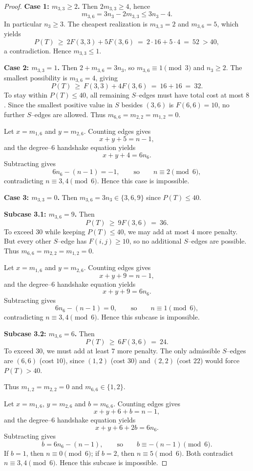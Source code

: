 \documentclass[preprint,12pt]{elsarticle}
\begin{document}
\begin{proof}
\smallskip
\noindent
\textbf{Case 1: $m_{3,3}\ge 2$.}
Then $2m_{3,3}\ge 4$, hence
\[
m_{3,6}=3n_3-2m_{3,3}\le 3n_3-4.
\]
In particular $n_3\ge 3$.
The cheapest realization is $m_{3,3}=2$ and $m_{3,6}=5$, which yields
\[
P(T)\ \ge\ 2F(3,3)+5F(3,6)\ =\ 2\cdot 16 + 5\cdot 4\ =\ 52\ >40,
\]
a contradiction. Hence $m_{3,3}\le 1$.

\smallskip
\noindent
\textbf{Case 2: $m_{3,3}=1$.}
Then $2+m_{3,6}=3n_3$, so $m_{3,6}\equiv 1\pmod 3$ and $n_3\ge 2$.
The smallest possibility is $m_{3,6}=4$, giving
\[
P(T)\ \ge\ F(3,3)+4F(3,6)\ =\ 16+16\ =\ 32.
\]
To stay within $P(T)\le 40$, all remaining $S$–edges must have total cost at most $8$.
Since the smallest positive value in $S$ besides $(3,6)$ is $F(6,6)=10$,
no further $S$–edges are allowed.
Thus $m_{6,6}=m_{2,2}=m_{1,2}=0$.

Let $x=m_{1,6}$ and $y=m_{2,6}$.
Counting edges gives
\[
x+y+5=n-1,
\]
and the degree–$6$ handshake equation yields
\[
x+y+4=6n_6.
\]
Subtracting gives
\[
6n_6-(n-1)=-1,
\qquad\text{so}\qquad
n\equiv 2\pmod 6,
\]
contradicting $n\equiv 3,4\pmod 6$.
Hence this case is impossible.

\smallskip
\noindent
\textbf{Case 3: $m_{3,3}=0$.}
Then $m_{3,6}=3n_3\in\{3,6,9\}$ since $P(T)\le 40$.

\smallskip
\noindent
\textbf{Subcase 3.1: $m_{3,6}=9$.}
Then
\[
P(T)\ \ge\ 9F(3,6)\ =\ 36.
\]
To exceed $30$ while keeping $P(T)\le 40$, we may add at most $4$ more penalty.
But every other $S$–edge has $F(i,j)\ge 10$, so no additional $S$–edges are possible.
Thus $m_{6,6}=m_{2,2}=m_{1,2}=0$.

Let $x=m_{1,6}$ and $y=m_{2,6}$.
Counting edges gives
\[
x+y+9=n-1,
\]
and the degree–$6$ handshake equation yields
\[
x+y+9=6n_6.
\]
Subtracting gives
\[
6n_6-(n-1)=0,
\qquad\text{so}\qquad
n\equiv 1\pmod 6,
\]
contradicting $n\equiv 3,4\pmod 6$.
Hence this subcase is impossible.

\smallskip
\noindent
\textbf{Subcase 3.2: $m_{3,6}=6$.}
Then
\[
P(T)\ \ge\ 6F(3,6)\ =\ 24.
\]
To exceed $30$, we must add at least $7$ more penalty.
The only admissible $S$–edges are $(6,6)$ (cost $10$),
since $(1,2)$ (cost $30$) and  $(2,2)$ (cost $22$) would force $P(T)>40$.

Thus $m_{1,2}=m_{2,2}=0$ and $m_{6,6}\in\{1,2\}$.

Let $x=m_{1,6}$, $y=m_{2,6}$ and $b=m_{6,6}$.
Counting edges gives
\[
x+y+6+b=n-1,
\]
and the degree–$6$ handshake equation yields
\[
x+y+6+2b=6n_6.
\]
Subtracting gives
\[
b=6n_6-(n-1),
\qquad\text{so}\qquad
b\equiv -(n-1)\pmod 6.
\]
If $b=1$, then $n\equiv 0\pmod 6$;  
if $b=2$, then $n\equiv 5\pmod 6$.
Both contradict $n\equiv 3,4\pmod 6$.
Hence this subcase is impossible.


\end{proof}
\end{document}
